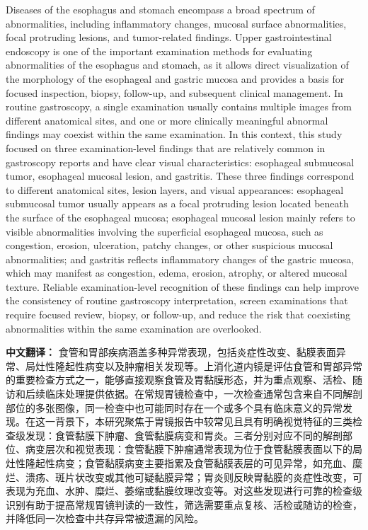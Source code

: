 \documentclass[Afour,sagev,times]{sagej}
\begin{document}
Diseases of the esophagus and stomach encompass a broad spectrum of abnormalities, including inflammatory changes, mucosal surface abnormalities, focal protruding lesions, and tumor-related findings. Upper gastrointestinal endoscopy is one of the important examination methods for evaluating abnormalities of the esophagus and stomach, as it allows direct visualization of the morphology of the esophageal and gastric mucosa and provides a basis for focused inspection, biopsy, follow-up, and subsequent clinical management. In routine gastroscopy, a single examination usually contains multiple images from different anatomical sites, and one or more clinically meaningful abnormal findings may coexist within the same examination. In this context, this study focused on three examination-level findings that are relatively common in gastroscopy reports and have clear visual characteristics: esophageal submucosal tumor, esophageal mucosal lesion, and gastritis. These three findings correspond to different anatomical sites, lesion layers, and visual appearances: esophageal submucosal tumor usually appears as a focal protruding lesion located beneath the surface of the esophageal mucosa; esophageal mucosal lesion mainly refers to visible abnormalities involving the superficial esophageal mucosa, such as congestion, erosion, ulceration, patchy changes, or other suspicious mucosal abnormalities; and gastritis reflects inflammatory changes of the gastric mucosa, which may manifest as congestion, edema, erosion, atrophy, or altered mucosal texture. Reliable examination-level recognition of these findings can help improve the consistency of routine gastroscopy interpretation, screen examinations that require focused review, biopsy, or follow-up, and reduce the risk that coexisting abnormalities within the same examination are overlooked.

\textbf{中文翻译：} 食管和胃部疾病涵盖多种异常表现，包括炎症性改变、黏膜表面异常、局灶性隆起性病变以及肿瘤相关发现等。上消化道内镜是评估食管和胃部异常的重要检查方式之一，能够直接观察食管及胃黏膜形态，并为重点观察、活检、随访和后续临床处理提供依据。在常规胃镜检查中，一次检查通常包含来自不同解剖部位的多张图像，同一检查中也可能同时存在一个或多个具有临床意义的异常发现。在这一背景下，本研究聚焦于胃镜报告中较常见且具有明确视觉特征的三类检查级发现：食管黏膜下肿瘤、食管黏膜病变和胃炎。三者分别对应不同的解剖部位、病变层次和视觉表现：食管黏膜下肿瘤通常表现为位于食管黏膜表面以下的局灶性隆起性病变；食管黏膜病变主要指累及食管黏膜表层的可见异常，如充血、糜烂、溃疡、斑片状改变或其他可疑黏膜异常；胃炎则反映胃黏膜的炎症性改变，可表现为充血、水肿、糜烂、萎缩或黏膜纹理改变等。对这些发现进行可靠的检查级识别有助于提高常规胃镜判读的一致性，筛选需要重点复核、活检或随访的检查，并降低同一次检查中共存异常被遗漏的风险。
\end{document}
